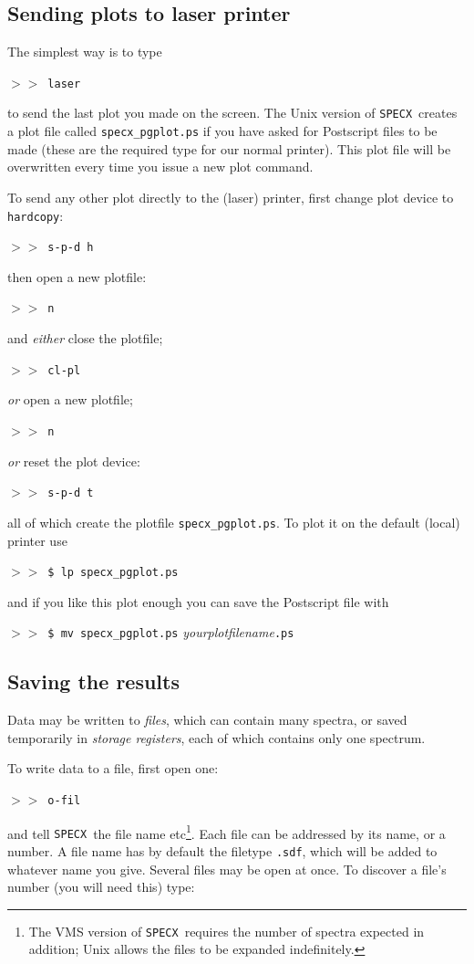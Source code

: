 \documentclass[11pt,twoside]{article}
\newcommand{\SPECX}{{\tt SPECX}}
\newcommand{\margnote}[1]
{\marginpar{({\it{\ref{#1}}})}}
\newcommand{\SP}{{$>\!>$}}
\begin{document}
\subsection{Sending plots to laser printer}
The \margnote{sec:specx_12} simplest way is to type

\SP\ {\tt{laser}}

to send the last plot you made on the screen. The Unix version of
\SPECX\ creates a plot file called \verb|specx_pgplot.ps| if you have
asked for Postscript files to be made (these are the required type for
our normal printer). This plot file will be overwritten every time you
issue a new plot command.

To send any other plot directly to the (laser) printer, first change plot 
device to {\tt{hardcopy}}:

\SP\ {\tt{s-p-d h}}

then open a new plotfile:

\SP\ {\tt{n}}

and {\it{either}} close the plotfile;

\SP\ {\tt{cl-pl}} 

{\it or} open a new plotfile;

\SP\ {\tt{n}}

{\it{or}} reset the plot device:

\SP\ {\tt{s-p-d t}}

all of which create the plotfile \verb|specx_pgplot.ps|. 
To plot it on the default (local) printer use

\SP\ \verb|$ lp specx_pgplot.ps|

and if you like this plot enough you can save the Postscript file with

\SP\ \verb|$ mv specx_pgplot.ps| {\it{yourplotfilename}}{\tt{.ps}}

\normalmarginpar
\subsection{Saving the results}
Data may be written to {\it{files}}, which can contain many spectra, or
saved temporarily in {\it{storage registers}}, each of which contains
only one spectrum. 

To write data to a file, first open one\margnote{sec:data-files}:

\SP\ {\tt{o-fil}}

and tell \SPECX\ the file name etc\footnote{The VMS version of \SPECX\
requires the number of spectra expected in addition; Unix allows the
files to be expanded indefinitely.}. Each file can be addressed by its
name, or a number. A file name has by default the filetype {\tt{.sdf}},
which will be added to whatever name you give. Several files may be
open at once. To discover a file's number (you will need this) type:
\end{document}
